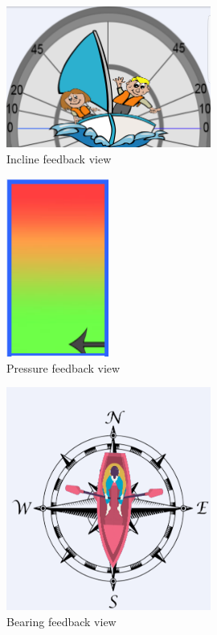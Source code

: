\begin{figure}[H]
\centering
\includegraphics[width=0.6\textwidth]{Figures/incline.png}
\caption{Incline feedback view}
\label{feedback-incline}
\end{figure}
\begin{figure}[H]
\centering
\includegraphics[width=0.3\textwidth]{Figures/pressure.png}
\caption{Pressure feedback view}
\label{feedback-pressure}
\end{figure}
\begin{figure}[H]
\centering
\includegraphics[width=0.6\textwidth]{Figures/compass.png}
\caption{Bearing feedback view}
\label{feedback-compass}
\end{figure}
